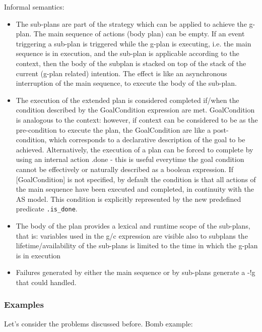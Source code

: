 Informal semantics:
\begin{itemize}

\item The sub-plans are part of the strategy which can be applied to achieve the g-plan.
%
The main sequence of actions (body plan) can be empty.
%
If an event triggering a sub-plan is triggered while the g-plan is executing, i.e. the main sequence is in execution, and the sub-plan is applicable according to the context, then the body of the subplan is stacked on top of the stack of the current (g-plan related) intention.
%
The effect is like an asynchronous interruption of the main sequence, to execute the body of the sub-plan.

\item The execution of the extended plan is considered completed if/when the condition described by the GoalCondition expression are met. 
%
GoalCondition is analogous to the context: however, if context can be considered to be as the pre-condition to execute the plan, the GoalCondition are like a post-condition, which corresponds to a declarative description of the goal to be achieved. 
%
Alternatively, the execution of a plan can be forced to complete by using an internal action .done - this is useful everytime the goal condition cannot be effectively or naturally described as a boolean expression.
%
If [GoalCondition] is not specified, by default the condition is that all actions of the main sequence have been executed and completed, in continuity with the AS model. This condition is explicitly represented by the new predefined predicate \texttt{.is\_done}.

\item The body of the plan provides a lexical and runtime scope of the sub-plans, that is: 
variables used in the g/c expression are visible also to subplans
 the lifetime/availability of the sub-plans is limited to the time in which the g-plan is in execution

\item Failures generated by either the main sequence or by sub-plans generate a -!g that could handled.

\end{itemize}

\subsubsection{Examples}

Let's consider the problems discussed before. 
%
Bomb example:

